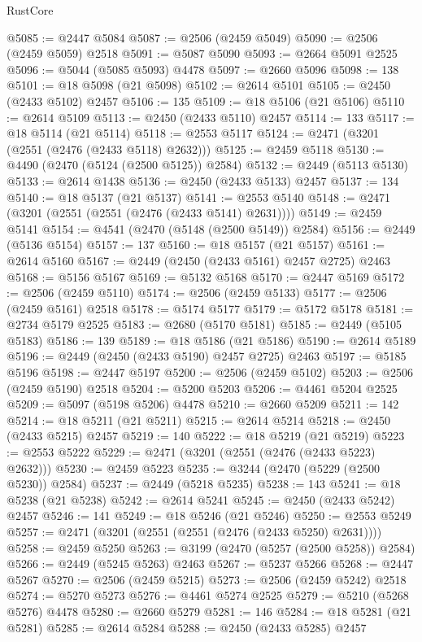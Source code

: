 \begin{lexlean}{RustCore}
\begin{coremodule}
@5085 := @2447 @5084
@5087 := @2506 (@2459 @5049)
@5090 := @2506 (@2459 @5059) @2518
@5091 := @5087 @5090
@5093 := @2664 @5091 @2525
@5096 := @5044 (@5085 @5093) @4478
@5097 := @2660 @5096
@5098 := 138
@5101 := @18 @5098 (@21 @5098)
@5102 := @2614 @5101
@5105 := @2450 (@2433 @5102) @2457
@5106 := 135
@5109 := @18 @5106 (@21 @5106)
@5110 := @2614 @5109
@5113 := @2450 (@2433 @5110) @2457
@5114 := 133
@5117 := @18 @5114 (@21 @5114)
@5118 := @2553 @5117
@5124 := @2471 (@3201 (@2551 (@2476 (@2433 @5118) @2632)))
@5125 := @2459 @5118
@5130 := @4490 (@2470 (@5124 (@2500 @5125)) @2584)
@5132 := @2449 (@5113 @5130)
@5133 := @2614 @1438
@5136 := @2450 (@2433 @5133) @2457
@5137 := 134
@5140 := @18 @5137 (@21 @5137)
@5141 := @2553 @5140
@5148 := @2471 (@3201 (@2551 (@2551 (@2476 (@2433 @5141) @2631))))
@5149 := @2459 @5141
@5154 := @4541 (@2470 (@5148 (@2500 @5149)) @2584)
@5156 := @2449 (@5136 @5154)
@5157 := 137
@5160 := @18 @5157 (@21 @5157)
@5161 := @2614 @5160
@5167 := @2449 (@2450 (@2433 @5161) @2457 @2725) @2463
@5168 := @5156 @5167
@5169 := @5132 @5168
@5170 := @2447 @5169
@5172 := @2506 (@2459 @5110)
@5174 := @2506 (@2459 @5133)
@5177 := @2506 (@2459 @5161) @2518
@5178 := @5174 @5177
@5179 := @5172 @5178
@5181 := @2734 @5179 @2525
@5183 := @2680 (@5170 @5181)
@5185 := @2449 (@5105 @5183)
@5186 := 139
@5189 := @18 @5186 (@21 @5186)
@5190 := @2614 @5189
@5196 := @2449 (@2450 (@2433 @5190) @2457 @2725) @2463
@5197 := @5185 @5196
@5198 := @2447 @5197
@5200 := @2506 (@2459 @5102)
@5203 := @2506 (@2459 @5190) @2518
@5204 := @5200 @5203
@5206 := @4461 @5204 @2525
@5209 := @5097 (@5198 @5206) @4478
@5210 := @2660 @5209
@5211 := 142
@5214 := @18 @5211 (@21 @5211)
@5215 := @2614 @5214
@5218 := @2450 (@2433 @5215) @2457
@5219 := 140
@5222 := @18 @5219 (@21 @5219)
@5223 := @2553 @5222
@5229 := @2471 (@3201 (@2551 (@2476 (@2433 @5223) @2632)))
@5230 := @2459 @5223
@5235 := @3244 (@2470 (@5229 (@2500 @5230)) @2584)
@5237 := @2449 (@5218 @5235)
@5238 := 143
@5241 := @18 @5238 (@21 @5238)
@5242 := @2614 @5241
@5245 := @2450 (@2433 @5242) @2457
@5246 := 141
@5249 := @18 @5246 (@21 @5246)
@5250 := @2553 @5249
@5257 := @2471 (@3201 (@2551 (@2551 (@2476 (@2433 @5250) @2631))))
@5258 := @2459 @5250
@5263 := @3199 (@2470 (@5257 (@2500 @5258)) @2584)
@5266 := @2449 (@5245 @5263) @2463
@5267 := @5237 @5266
@5268 := @2447 @5267
@5270 := @2506 (@2459 @5215)
@5273 := @2506 (@2459 @5242) @2518
@5274 := @5270 @5273
@5276 := @4461 @5274 @2525
@5279 := @5210 (@5268 @5276) @4478
@5280 := @2660 @5279
@5281 := 146
@5284 := @18 @5281 (@21 @5281)
@5285 := @2614 @5284
@5288 := @2450 (@2433 @5285) @2457

\end{coremodule}
\end{lexlean}
